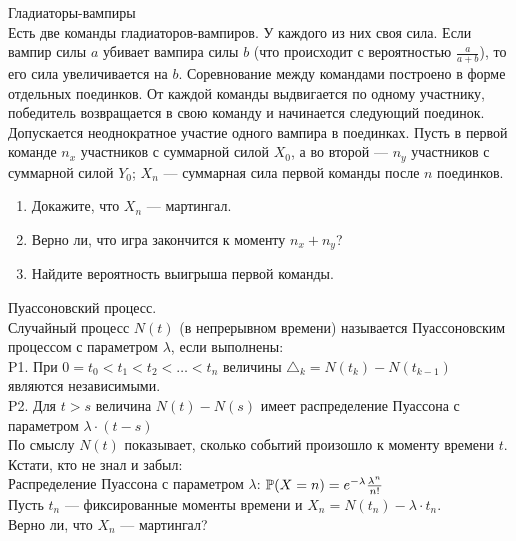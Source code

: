 \begin{problem}
 Гладиаторы-вампиры \\
Есть две команды гладиаторов-вампиров. У каждого из них своя сила.
Если вампир силы $a$ убивает вампира силы $b$ (что происходит с
вероятностью $\frac{a}{a+b}$), то его сила увеличивается на $b$.
Соревнование между командами построено в форме отдельных
поединков. От каждой команды выдвигается по одному участнику,
победитель возвращается в свою команду и начинается следующий
поединок. Допускается неоднократное участие одного вампира в
поединках. Пусть в первой команде $n_{x}$ участников с суммарной
силой $X_{0}$, а во второй — $n_{y}$ участников с суммарной силой
$Y_{0}$; $X_{n}$ — суммарная сила первой команды после $n$
поединков.
\begin{enumerate}
\item  Докажите, что $X_{n}$ — мартингал.
\item Верно ли, что игра закончится к моменту $n_{x}+n_{y}$?
\item Найдите вероятность выигрыша первой команды.
\end{enumerate}

\begin{sol}

\end{sol}
\end{problem}

\begin{problem}
 Пуассоновский процесс. \\
Случайный процесс $N(t)$ (в непрерывном времени) называется
Пуассоновским
процессом с параметром $\lambda$, если выполнены: \\
P1. При $0=t_{0}<t_{1}<t_{2}<\ldots<t_{n}$ величины
$\triangle_{k}=N(t_{k})-N(t_{k-1})$ являются независимыми. \\
P2. Для $t>s$ величина $N(t)-N(s)$ имеет распределение Пуассона с
параметром $\lambda \cdot (t-s)$ \\
По смыслу $N(t)$ показывает, сколько событий произошло к моменту
времени $t$. \\
Кстати, кто не знал и забыл: \\
Распределение Пуассона с параметром $\lambda$:
$\P(X=n)=e^{-\lambda}\frac{\lambda^{n}}{n!}$ \\
Пусть $t_{n}$ — фиксированные моменты времени и
$X_{n}=N(t_{n})-\lambda\cdot t_{n}$. \\
Верно ли, что $X_{n}$ — мартингал?

\begin{sol}

\end{sol}
\end{problem}

